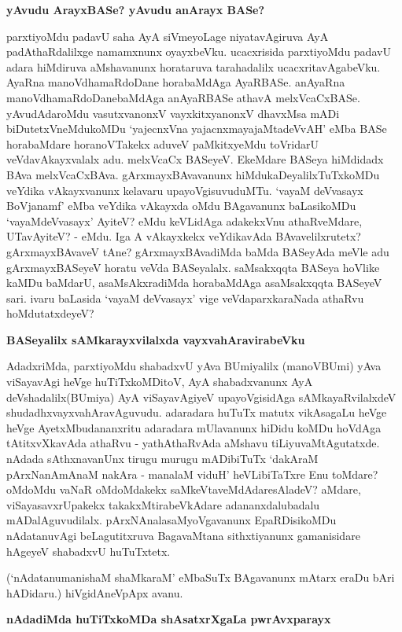 {\bigskip
\noindent
{\large\bf yAvudu ArayxBASe? yAvudu anArayx BASe?}}\label{page174}
\medskip

\noindent
parxtiyoMdu padavU saha AyA siVmeyoLage niyatavAgiruva AyA padAthaR\-dalilxge namamxnunx\- oyayxbeVku. ucacxrisida parxtiyoMdu padavU adara hiMdiruva aMshavanunx horataruva tarahadalilx ucacxritavAgabeVku. AyaRna manoVdhamaR\-doDane horabaMdAga AyaRBASe. anAyaRna manoV\-dhamaRdoDane\break baMdAga anAyaRBASe athavA melxVcaCxBASe. yAvudAdaroMdu vasutxvanonxV vayxkitx\-yanonxV dhavxMsa mADi biDutetxVneMdukoMDu `yajecnxVna yajacnxmayajaMta\break \hbox{deVvAH}' eMba BASe hora\-baMdare horanoVTakekx aduveV paMkitxyeMdu toVri\-darU veVdavAkayxvalalx adu. melxVcaCx BASeyeV. EkeMdare BASeya hiMdidadx BAva melxVcaCxBAva. gArxmayxBAvavanunx hiMdukaDeyalilxTuTxkoMDu veYdika vAkayxvanunx kela\-varu upayoVgisuvuduMTu. `vayaM deVvasayx BoVjanamf' eMba veYdika vAkayxda oMdu BAga\-vanunx baLasikoMDu `vayaMdeVvasayx' AyiteV? eMdu keVLidAga ada\-kekxVnu athaR\-veMdare, UTavAyiteV? - eMdu. Iga A vAkayxkekx veYdikavAda BAvavelilxrutetx? gArxmayxBAvaveV tAne? gArxmayxBA\-vadiMda baMda BASeyAda meVle adu gArxmayxBASeyeV horatu veVda BASeyalalx. saMsakxqqta BASeya hoVlike kaMDu baMdarU, asaMsAkxradiMda horabaMdAga asaMsakxqqta BASeyeV sari. ivaru baLa\-sida `vayaM deVvasayx' vige veVdaparxkaraNada athaRvu hoMdutatxdeyeV?

{\bigskip
\noindent
{\large\bf BASeyalilx sAMkarayxvilalxda vayxvahAravirabeVku}}\label{page174}
\medskip

\noindent
AdadxriMda, parxtiyoMdu shabadxvU yAva BUmiyalilx (manoVBUmi) yAva viSayavAgi heVge\- huTiTx\-koMDitoV, AyA shabadxvanunx AyA deVshadalilx\break \hbox{(BUmiya)} AyA viSayavAgiyeV upa\-yoV\-gisi\-dAga sAMkayaRvilalxdeV shudadhx\-vayxvahAravAguvudu. adaradara huTuTx matutx vikAsagaLu heVge heVge AyetxMbu\-dananxritu adaradara mUlavanunx hiDidu koMDu hoVdAga tAtitxvXkavAda athaRvu - yathA\-thaRvAda aMshavu tiLiyuvaMtAgutatxde. nAdada sAthxnavanUnx tirugu murugu mADibiTuTx `dakAraM pArxNa\-nAmAnaM nakAra - manalaM viduH' heVLi\break\-biTaTxre Enu toMdare? oMdoMdu vaNaR oMdoM\-dakekx saMkeVtaveMdAdare\break sAladeV? aMdare, viSayasavxrUpakekx takakxMtirabeVkAdare adananxdalubadalu mADa\-lAguvudilalx. pArxNAnalasaMyoVgavanunx EpaRDisikoMDu nAdatanuvAgi beLa\-gutitxruva Baga\-vaMtana sithxti\-yanunx gamanisidare hAgeyeV shabadxvU huTuTxtetx.

(`nAdatanumanishaM shaMkaraM' eMbaSuTx BAgavanunx mAtarx eraDu bAri hADidaru.) hiVgidAneVpApx avanu.

{\bigskip
\noindent
{\large\bf nAdadiMda huTiTxkoMDa shAsatxrXgaLa pwrAvxparayx}}
\medskip

